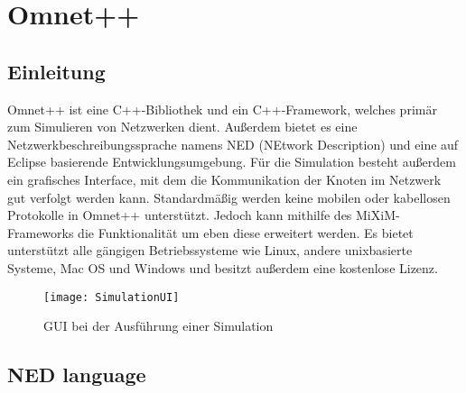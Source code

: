 \section{Omnet++}

\subsection{Einleitung}

Omnet++\cite{omnet} ist eine C++-Bibliothek und ein C++-Framework, welches primär zum Simulieren von Netzwerken dient. Außerdem bietet es eine Netzwerkbeschreibungssprache namens NED (NEtwork Description) und eine auf Eclipse\cite{eclipse} basierende Entwicklungsumgebung. Für die Simulation besteht außerdem ein grafisches Interface, mit dem die Kommunikation der Knoten im Netzwerk gut verfolgt werden kann.
\newline Standardmäßig werden keine mobilen oder kabellosen Protokolle in Omnet++ unterstützt. Jedoch kann mithilfe des MiXiM-Frameworks die Funktionalität um eben diese erweitert werden.
\newline Es bietet unterstützt alle gängigen Betriebssysteme wie Linux, andere unixbasierte Systeme, Mac OS und Windows und besitzt außerdem eine kostenlose Lizenz.

\begin{figure}[htbp]
\centering
\caption{GUI bei der Ausführung einer Simulation }
\label{fig:messageEvent}
\texttt{[image: SimulationUI]}
\end{figure}

\subsection{NED language}\label{NED language} 

